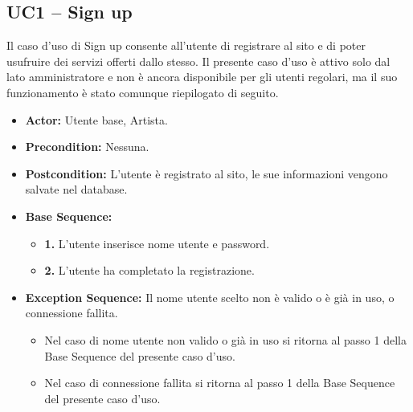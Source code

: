 \subsection{UC1 -- Sign up}
Il caso d'uso di Sign up consente all'utente di registrare al sito 
e di poter usufruire dei servizi offerti dallo stesso. 
Il presente caso d'uso è attivo solo dal lato amministratore e non è
ancora disponibile per gli utenti regolari, ma il suo funzionamento
è stato comunque riepilogato di seguito.

\begin{itemize}
    \item \textbf{Actor:} Utente base, Artista.
    \item \textbf{Precondition:} Nessuna.
    \item \textbf{Postcondition:} L'utente è registrato al sito, le sue informazioni vengono salvate nel database.
    \item \textbf{Base Sequence:} 
        \begin{itemize}
            \item \textbf{1.} L'utente inserisce nome utente e password.
            \item \textbf{2.} L'utente ha completato la registrazione.
        \end{itemize}
    \item \textbf{Exception Sequence:} Il nome utente scelto non è valido o è già in uso, o connessione fallita.
        \begin{itemize}
            \item Nel caso di nome utente non valido o già in uso si ritorna al passo 1 della Base Sequence del presente caso d'uso.
            \item Nel caso di connessione fallita si ritorna al passo 1 della Base Sequence del presente caso d'uso. 
        \end{itemize}
    
\end{itemize}
\vspace{1cm}

